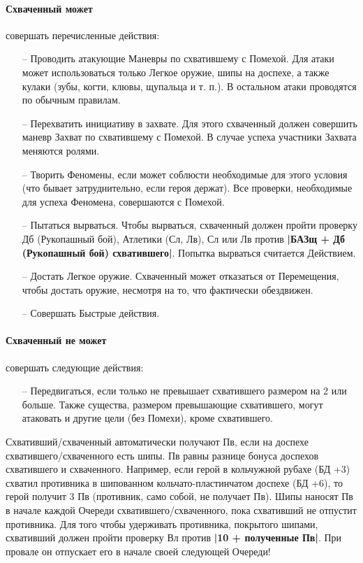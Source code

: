\paragraph{Схваченный может} совершать перечисленные действия:
\begin{itemize}
\item[--] Проводить атакующие Маневры по схватившему с Помехой. Для атаки может использоваться только Легкое оружие, шипы на доспехе, а также кулаки (зубы, когти, клювы, щупальца и т. п.). В остальном атаки проводятся по обычным правилам.
\item[--] Перехватить инициативу в захвате. Для этого схваченный должен совершить маневр Захват по схватившему с Помехой. В случае успеха участники Захвата меняются ролями.
\item[--] Творить Феномены, если может соблюсти необходимые для этого условия (что бывает затруднительно, если героя держат). Все проверки, необходимые для успеха Феномена, совершаются с Помехой.
\item[--] Пытаться вырваться. Чтобы вырваться, схваченный должен пройти проверку Дб (Рукопашный бой), Атлетики (Сл, Лв), Сл или Лв против \textbf{|БАЗщ + Дб (Рукопашный бой) схватившего|}. Попытка вырваться считается Действием.
\item[--] Достать Легкое оружие. Схваченный может отказаться от Перемещения, чтобы достать оружие, несмотря на то, что фактически обездвижен.
\item[--] Совершать Быстрые действия.
\end{itemize}
\paragraph{Схваченный не может} совершать следующие действия:
\begin{itemize}
\item[--] Передвигаться, если только не превышает схватившего размером на 2 или больше. Также существа, размером превышающие схватившего, могут атаковать и другие цели (без Помехи), кроме схватившего. 
\end{itemize}
Схвативший/схваченный автоматически получают Пв, если на доспехе схватившего/схваченного есть шипы. Пв равны разнице бонуса доспехов схватившего и схваченного. Например, если герой в кольчужной рубахе (БД +3) схватил противника в шипованном кольчато-пластинчатом доспехе (БД +6), то герой получит 3 Пв (противник, само собой, не получает Пв). Шипы наносят Пв в начале каждой Очереди схватившего/схваченного, пока схвативший не отпустит противника. Для того чтобы удерживать противника, покрытого шипами, схвативший должен пройти проверку Вл против \textbf{|10 + полученные Пв|}. При провале он отпускает его в начале своей следующей Очереди!
